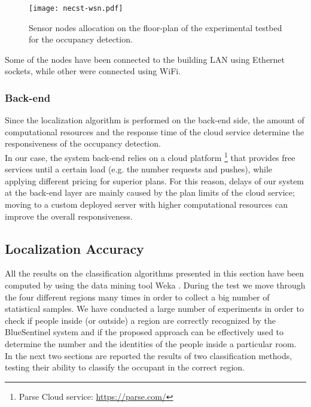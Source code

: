 \begin{figure}[h!tb]
\centering\texttt{[image: necst-wsn.pdf]}
\caption[Sensor nodes allocation on the floor-plan of the experimental testbed for the occupancy detection.]{Sensor nodes allocation on the floor-plan of the experimental testbed for the occupancy detection.}
\label{fig:wsn-sketch}
\end{figure}

Some of the nodes have been connected to the building LAN using Ethernet sockets, while other were connected using WiFi.

\subsubsection{Back-end}
\label{sub:test-backend}
Since the localization algorithm is performed on the back-end side, the amount of computational resources and the response time of the cloud service determine the responsiveness of the occupancy detection.\\
In our case, the system back-end relies on a cloud platform
\footnote{Parse Cloud service: \url{https://parse.com/}}
that provides free services until a certain load (e.g. the number requests and pushes), while applying different pricing for superior plans.
For this reason, delays of our system at the back-end layer are mainly caused by the plan limits of the cloud service; moving to a custom deployed server with higher computational resources can improve the overall responsiveness.

\subsection{Localization Accuracy}
\label{sec:loc-accuracy}
All the results on the classification algorithms presented in this section have been computed by using the data mining tool Weka \cite{Hall2009}.
During the test we move through the four different regions many times in order to collect a big number of statistical samples.
We have conducted a large number of experiments in order to check if people inside (or outside) a region are correctly recognized by the BlueSentinel system and if the proposed approach can be effectively used to determine the number and the identities of the people inside a particular room.
In the next two sections are reported the results of two classification methods, testing their ability to classify the occupant in the correct region.

